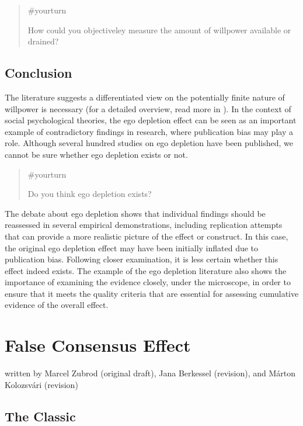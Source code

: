 \documentclass[
  letterpaper,
]{book}
\begin{document}
\begin{quote}
{\#yourturn}

How could you objectiveley measure the amount of willpower available or
drained?
\end{quote}

\section{Conclusion}\label{conclusion}

The literature suggests a differentiated view on the potentially finite
nature of willpower is necessary (for a detailed overview, read more in
). In the context of social
psychological theories, the ego depletion effect can be seen as an
important example of contradictory findings in research, where
publication bias may play a role. Although several hundred studies on
ego depletion have been published, we cannot be sure whether ego
depletion exists or not.

\begin{quote}
{\#yourturn}

Do you think ego depletion exists?
\end{quote}

The debate about ego depletion shows that individual findings should be
reassessed in several empirical demonstrations, including replication
attempts that can provide a more realistic picture of the effect or
construct. In this case, the original ego depletion effect may have been
initially inflated due to publication bias. Following closer
examination, it is less certain whether this effect indeed exists. The
example of the ego depletion literature also shows the importance of
examining the evidence closely, under the microscope, in order to ensure
that it meets the quality criteria that are essential for assessing
cumulative evidence of the overall effect.


\chapter{\texorpdfstring{{False Consensus
Effect}}{False Consensus Effect}}\label{false-consensus-effect}

{written by Marcel Zubrod (original draft), Jana Berkessel (revision),
and Márton Kolozsvári (revision)}

\section{The Classic}\label{the-classic-1}
\end{document}
